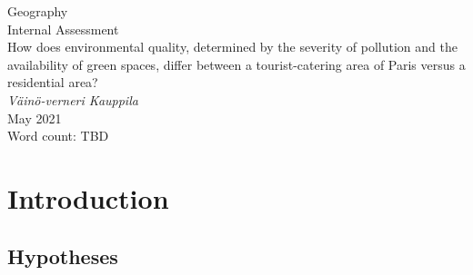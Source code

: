 \documentclass[11pt,letterpaper]{article}
\begin{document}



\begin{titlepage}
    \begin{center}
        \vspace*{4cm}
        Geography\\
        Internal Assessment \\
        \vspace{1cm}
        How does environmental quality, determined by the severity of pollution and the availability of green spaces, differ between a tourist-catering area of Paris versus a residential area? \\
        \vspace{1cm}
        \textit{Väinö-verneri Kauppila} \\
        May 2021 \\
        \vspace{4cm}
        Word count: TBD \\
        \vfill
        \vspace{0.1cm}
    \end{center}
\end{titlepage}



\begin{center}
    \tableofcontents
    \vspace{1in}

\end{center}



\newpage


\section{Introduction}




\subsection{Hypotheses}
\end{document}
